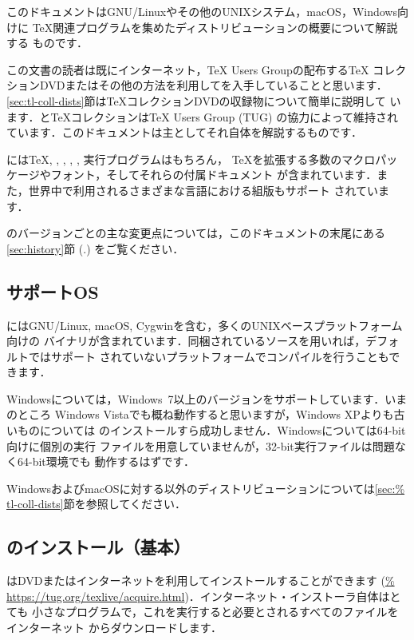 \documentclass[uplatex,dvipdfmx,tombow]{jsarticle}
\begin{document}
このドキュメントはGNU/Linuxやその他のUNIXシステム，macOS，Windows向けに
\TeX 関連プログラムを集めたディストリビューション\TL の概要について解説する
ものです．

この文書の読者は既にインターネット，{\TeX} Users Groupの配布する\TeX
コレクションDVDまたはその他の方法を利用して\TL を入手していることと思います．
\ref{sec:tl-coll-dists}節は\TeX コレクションDVDの収録物について簡単に説明して
います．\TL と\TeX コレクションは{\TeX} Users Group (TUG) の協力によって維持され
ています．このドキュメントは主として\TL それ自体を解説するものです．

\TL には\TeX, \LaTeXe, \ConTeXt, \MF, \MP, \BibTeX 実行プログラムはもちろん，
\TeX を拡張する多数のマクロパッケージやフォント，そしてそれらの付属ドキュメント
が含まれています．また，世界中で利用されるさまざまな言語における組版もサポート
されています．

\TL のバージョンごとの主な変更点については，このドキュメントの末尾にある
\ref{sec:history}節 (\p.\pageref{sec:history}) をご覧ください．

\subsection{サポートOS}
\label{sec:os-support}

\TL にはGNU/Linux, macOS, Cygwinを含む，多くのUNIXベースプラットフォーム向けの
バイナリが含まれています．同梱されているソースを用いれば，デフォルトではサポート
されていないプラットフォームでコンパイルを行うこともできます．

Windowsについては，Windows~7以上のバージョンをサポートしています．いまのところ
Windows Vistaでも概ね動作すると思いますが，Windows XPよりも古いものについては
\TL のインストールすら成功しません．Windowsについては64-bit向けに個別の実行
ファイルを用意していませんが，32-bit実行ファイルは問題なく64-bit環境でも
動作するはずです．

WindowsおよびmacOSに対する\TL 以外のディストリビューションについては\ref{sec:%
tl-coll-dists}節を参照してください．

\subsection{\TL のインストール（基本）}
\label{sec:basic}

\TL はDVDまたはインターネットを利用してインストールすることができます (\url{%
https://tug.org/texlive/acquire.html})．インターネット・インストーラ自体はとても
小さなプログラムで，これを実行すると必要とされるすべてのファイルをインターネット
からダウンロードします．
\end{document}

